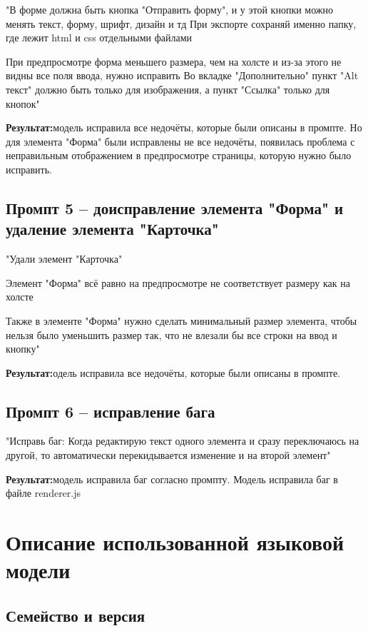 \documentclass[14pt,a4paper]{extarticle}
\begin{document}
{{"В форме должна быть кнопка "Отправить форму", и у этой кнопки можно менять текст, форму, шрифт, дизайн и тд
При экспорте сохраняй именно папку, где лежит html и css отдельными файлами

При предпросмотре форма меньшего размера, чем на холсте и из-за этого не видны все поля ввода, нужно исправить
Во вкладке "Дополнительно" пункт "Alt текст" должно быть только для изображения, а пункт "Ссылка" только для кнопок"

\textbf{Результат:}модель исправила все недочёты, которые были описаны в промпте. Но для элемента "Форма" были исправлены не все недочёты, появилась проблема с неправильным отображением в предпросмотре страницы, которую нужно было исправить.

\subsection{Промпт 5 -- доисправление элемента "Форма" и удаление элемента "Карточка"}

"Удали элемент "Карточка"

Элемент "Форма" всё равно на предпросмотре не соответствует размеру как на холсте

Также в элементе "Форма" нужно сделать минимальный размер элемента, чтобы нельзя было уменьшить размер так, что не влезали бы все строки на ввод и кнопку"

\textbf{Результат:}одель исправила все недочёты, которые были описаны в промпте.

\subsection{Промпт 6 -- исправление бага}

"Исправь баг:
Когда редактирую текст одного элемента и сразу переключаюсь на другой, то автоматически перекидывается изменение и на второй элемент"

\textbf{Результат:}модель исправила баг согласно промпту. Модель исправила баг в файле renderer.js

\newpage
\section{Описание использованной языковой модели}

\subsection{Семейство и версия}

}}
\end{document}
